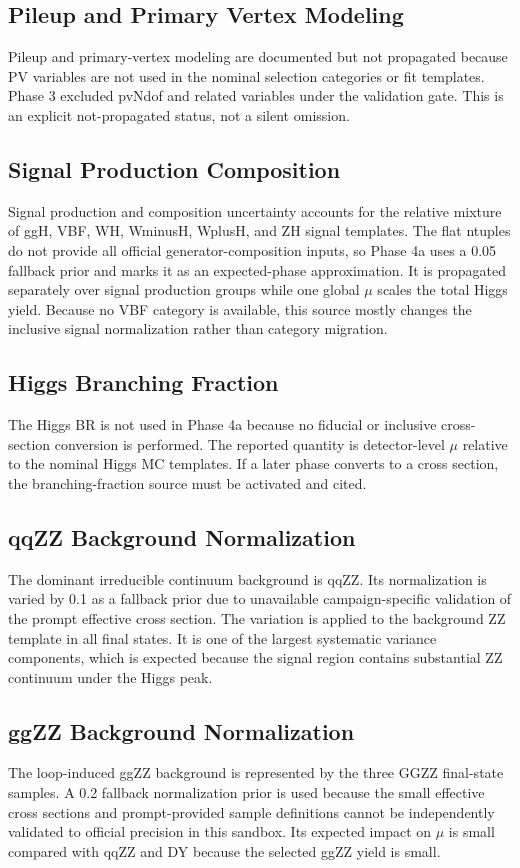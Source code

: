 \documentclass[11pt]{article}
\begin{document}
\subsection{Pileup and Primary Vertex Modeling}
Pileup and primary-vertex modeling are documented but not propagated because PV variables are not used in the nominal selection categories or fit templates. Phase 3 excluded pvNdof and related variables under the validation gate. This is an explicit not-propagated status, not a silent omission.

\subsection{Signal Production Composition}
Signal production and composition uncertainty accounts for the relative mixture of ggH, VBF, WH, WminusH, WplusH, and ZH signal templates. The flat ntuples do not provide all official generator-composition inputs, so Phase 4a uses a 0.05 fallback prior and marks it as an expected-phase approximation. It is propagated separately over signal production groups while one global $\mu$ scales the total Higgs yield. Because no VBF category is available, this source mostly changes the inclusive signal normalization rather than category migration.

\subsection{Higgs Branching Fraction}
The Higgs BR is not used in Phase 4a because no fiducial or inclusive cross-section conversion is performed. The reported quantity is detector-level $\mu$ relative to the nominal Higgs MC templates. If a later phase converts to a cross section, the branching-fraction source must be activated and cited.

\subsection{qqZZ Background Normalization}
The dominant irreducible continuum background is qqZZ. Its normalization is varied by 0.1 as a fallback prior due to unavailable campaign-specific validation of the prompt effective cross section. The variation is applied to the background ZZ template in all final states. It is one of the largest systematic variance components, which is expected because the signal region contains substantial ZZ continuum under the Higgs peak.

\subsection{ggZZ Background Normalization}
The loop-induced ggZZ background is represented by the three GGZZ final-state samples. A 0.2 fallback normalization prior is used because the small effective cross sections and prompt-provided sample definitions cannot be independently validated to official precision in this sandbox. Its expected impact on $\mu$ is small compared with qqZZ and DY because the selected ggZZ yield is small.
\end{document}
